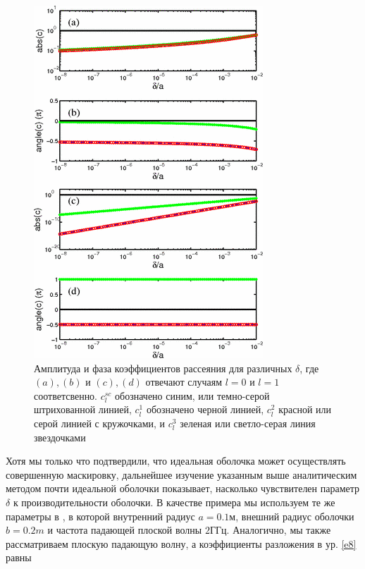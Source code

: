 \documentclass[a4paper, 12pt]{article}
\begin{document}
\begin{figure}[t]
  \centering
  \includegraphics[height=0.3\paperheight, width=0.26\paperwidth]{3.png}
  \caption{Амплитуда и фаза коэффициентов рассеяния для различных $\delta$, где $(a),(b)$ и $(c),(d)$ отвечают случаям 
  $l=0$ и $l=1$ соответсвенно. $c_l^{sc}$ обозначено синим, или темно-серой штрихованной линией, $c_l^{1}$ обозначено
  черной линией, $c_l^2$ красной или серой линией с кружочками, и $c_l^3$ зеленая или светло-серая линия звездочками}
  \label{fig:3}
\end{figure}

Хотя мы только что подтвердили, что идеальная оболочка может осуществлять совершенную маскировку, дальнейшее изучение
указанным выше аналитическим методом почти идеальной оболочки показывает, насколько чувствителен параметр $\delta$ к 
производительности оболочки. В качестве примера мы используем те же параметры в \cite{6}, в которой внутренний радиус $a=0.1м$,
внешний радиус оболочки $b=0.2m$ и частота падающей плоской волны $2ГГц$. Аналогично, мы также рассматриваем плоскую
падающую волну, а коэффициенты разложения в ур. \eqref{e8} равны
 
\end{document}
